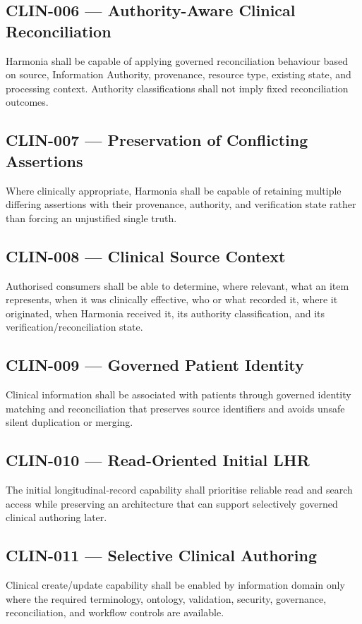 \subsection{CLIN-006 --- Authority-Aware Clinical Reconciliation}
Harmonia shall be capable of applying governed reconciliation behaviour based on source, Information Authority, provenance, resource type, existing state, and processing context. Authority classifications shall not imply fixed reconciliation outcomes.

\subsection{CLIN-007 --- Preservation of Conflicting Assertions}
Where clinically appropriate, Harmonia shall be capable of retaining multiple differing assertions with their provenance, authority, and verification state rather than forcing an unjustified single truth.

\subsection{CLIN-008 --- Clinical Source Context}
Authorised consumers shall be able to determine, where relevant, what an item represents, when it was clinically effective, who or what recorded it, where it originated, when Harmonia received it, its authority classification, and its verification/reconciliation state.

\subsection{CLIN-009 --- Governed Patient Identity}
Clinical information shall be associated with patients through governed identity matching and reconciliation that preserves source identifiers and avoids unsafe silent duplication or merging.

\subsection{CLIN-010 --- Read-Oriented Initial LHR}
The initial longitudinal-record capability shall prioritise reliable read and search access while preserving an architecture that can support selectively governed clinical authoring later.

\subsection{CLIN-011 --- Selective Clinical Authoring}
Clinical create/update capability shall be enabled by information domain only where the required terminology, ontology, validation, security, governance, reconciliation, and workflow controls are available.

